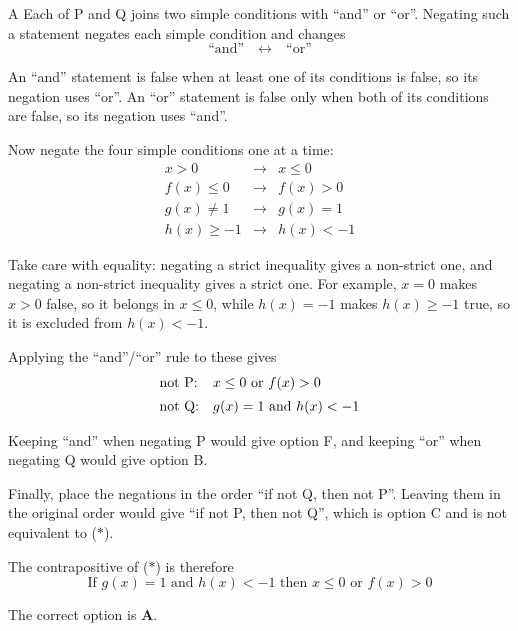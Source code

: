 \documentclass[11pt,a4paper]{article}
\begin{document}
\begin{enumerate}[label=\textbf{\arabic*.},leftmargin=*,itemsep=0pt,start=2]
\begin{djsSolution}{A}
Each of P and Q joins two simple conditions with ``and'' or ``or''. Negating such a statement negates each simple condition and changes
\[
\text{``and''}\quad\longleftrightarrow\quad\text{``or''}
\]

An ``and'' statement is false when at least one of its conditions is false, so its negation uses ``or''. An ``or'' statement is false only when both of its conditions are false, so its negation uses ``and''.

Now negate the four simple conditions one at a time:
\[
\begin{array}{rcl}
x>0 &\longrightarrow& x\le0\\[5pt]
f(x)\le0 &\longrightarrow& f(x)>0\\[5pt]
g(x)\neq1 &\longrightarrow& g(x)=1\\[5pt]
h(x)\ge-1 &\longrightarrow& h(x)<-1
\end{array}
\]

Take care with equality: negating a strict inequality gives a non-strict one, and negating a non-strict inequality gives a strict one. For example, $x=0$ makes $x>0$ false, so it belongs in $x\le0$, while $h(x)=-1$ makes $h(x)\ge-1$ true, so it is excluded from $h(x)<-1$.

Applying the ``and''/``or'' rule to these gives
\[
\begin{array}{@{}ll@{}}
\text{not P:} & x\le0\text{ or }f(x)>0\\[5pt]
\text{not Q:} & g(x)=1\text{ and }h(x)<-1
\end{array}
\]

Keeping ``and'' when negating P would give option F, and keeping ``or'' when negating Q would give option B.

Finally, place the negations in the order ``if not Q, then not P''. Leaving them in the original order would give ``if not P, then not Q'', which is option C and is not equivalent to ($\ast$).

The contrapositive of ($\ast$) is therefore
\[
\boxed{\text{If }g(x)=1\text{ and }h(x)<-1\text{ then }x\le0\text{ or }f(x)>0}
\]

The correct option is \textbf{A}.
\end{djsSolution}
\end{enumerate}
\clearpage
\thispagestyle{djssolutions}
\vspace*{8pt}
\end{document}
